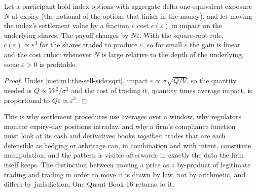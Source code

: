 \begin{proposition}\label{prop:m1:options-markets-europe-asia:leverage}
Let a participant hold index options with aggregate delta-one-equivalent
exposure $N$ at expiry (the notional of the options that finish in the
money), and let moving the index's settlement value by a fraction
$\varepsilon$ cost $c(\varepsilon)$ in impact on the underlying shares. The
payoff changes by $N\varepsilon$. With the square-root rule,
$c(\varepsilon) \propto \varepsilon^{3}$ for the shares traded to produce
$\varepsilon$, so for small $\varepsilon$ the gain is linear and the cost
cubic: whenever $N$ is large relative to the depth of the underlying, some
$\varepsilon > 0$ is profitable.
\end{proposition}
\begin{proof}
Under \cref{met:m1:the-sell-side:sqrt}, impact $\varepsilon \propto
\sigma\sqrt{Q/V}$, so the quantity needed is $Q \propto V\varepsilon^2/\sigma^2$
and the cost of trading it, quantity times average impact, is proportional to
$Q\varepsilon \propto \varepsilon^3$.
\end{proof}

This is why settlement procedures use averages over a window, why regulators
monitor expiry-day positions intraday, and why a firm's compliance function
must look at its cash and derivatives books \emph{together}: trades that are
each defensible as hedging or arbitrage can, in combination and with intent,
constitute manipulation, and the pattern is visible afterwards in exactly the
data the firm itself keeps. The distinction between moving a price as a
by-product of legitimate trading and trading in order to move it is drawn by
law, not by arithmetic, and differs by jurisdiction; One Quant Book 16
returns to it.

\begin{omfigure}

\label{fig:m1:options-markets-europe-asia:structure}
\end{omfigure}

